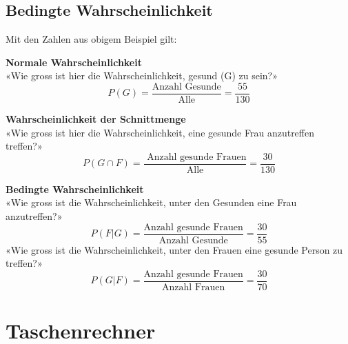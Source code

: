 \begin{multicols}{2}


\subsection*{Bedingte Wahrscheinlichkeit}


Mit den Zahlen aus obigem Beispiel gilt:

\textbf{Normale Wahrscheinlichkeit}\\
«Wie gross ist hier die Wahrscheinlichkeit, gesund (G) zu sein?»
$$P(G) = \frac{\textrm{Anzahl Gesunde}}{\textrm{Alle}} =  \frac{55}{130}$$

\textbf{Wahrscheinlichkeit der Schnittmenge}\\
«Wie gross ist hier die Wahrscheinlichkeit, eine gesunde Frau anzutreffen treffen?»
$$P(G\cap F) = \frac{\textrm{\ Anzahl gesunde Frauen}}{\textrm{Alle}}= \frac{30}{130}$$

\textbf{Bedingte Wahrscheinlichkeit}\\
«Wie gross ist die Wahrscheinlichkeit, unter den Gesunden eine Frau anzutreffen?»
$$P(F | G) = \frac{\textrm{Anzahl gesunde Frauen}}{\textrm{Anzahl Gesunde}} =  \frac{30}{55}$$
«Wie gross ist die Wahrscheinlichkeit, unter den Frauen eine gesunde Person zu treffen?»
$$P(G | F) = \frac{\textrm{Anzahl gesunde Frauen}}{\textrm{Anzahl Frauen}}=  \frac{30}{70}$$

\end{multicols}


\newpage
\keinHeaderUndKeinFooter{}

\section*{Taschenrechner}

